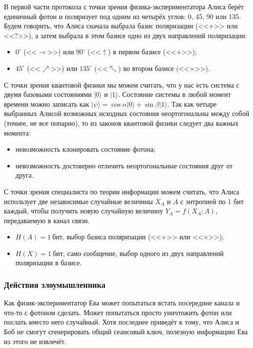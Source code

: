 В первой части протокола с точки зрения физика-экспериментатора Алиса берёт единичный фотон и поляризует под одним из четырёх углов: 0, 45, 90 или 135. Будем говорить, что Алиса сначала выбрала базис поляризации (<<+>> или <<?>>), а затем выбрала в этом базисе одно из двух направлений поляризации:

\begin{itemize}
	\item $0^{\circ}$ (<<$\rightarrow$>>) или $90^{\circ}$ (<<$\uparrow$) в первом базисе (<<+>>);
	\item $45^{\circ}$ (<<$\nearrow$>>) или $135^{\circ}$ (<<$\nwarrow$) во втором базисе (<<×>>).
\end{itemize}

С точки зрения квантовой физики мы можем считать, что у нас есть система с двумя базовыми состояниями $|0\rangle$ и $|1\rangle$. Состояние системы в любой момент времени можно записать как $| \psi \rangle = \cos \alpha |0\rangle + \sin \beta |1\rangle$. Так как четыре выбранных Алисой возможных исходных состояния неортогональны между собой (точнее, не все попарно), то из законов квантовой физики следует два важных момента:

\begin{itemize}
	\item невозможность клонировать состояние фотона;
	\item невозможность достоверно отличить неортогональные состояния друг от друга.
\end{itemize}

С точки зрения специалиста по теории информации можем считать, что Алиса использует две независимые случайные величины $X_A$ и $A$ с энтропией по 1 бит каждый, чтобы получить новую случайную величину $Y_A = f \left( X_A; A \right)$, передаваемую в канал связи.

\begin{itemize}
	\item $H \left( A \right) = 1~\text{бит}$, выбор базиса поляризации (<<+>> или <<×>>);
	\item $H \left( X \right) = 1~\text{бит}$, само сообщение, выбор одного из двух направлений поляризации в базисе.
\end{itemize}

\subsubsection{Действия злоумышленника}

Как физик-экспериментатор Ева может попытаться встать посередине канала и что-то с фотоном сделать. Может попытаться просто уничтожить фотон или послать вместо него случайный. Хотя последнее приведёт к тому, что Алиса и Боб не смогут сгенерировать общий сеансовый ключ, полезную информацию Ева из этого не извлечёт.

